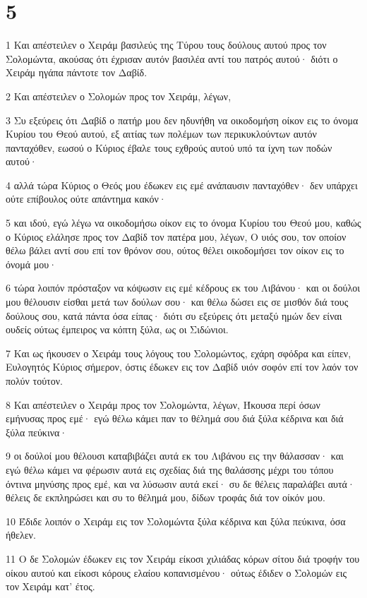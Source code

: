 \chapter{5}

\par 1 Και απέστειλεν ο Χειράμ βασιλεύς της Τύρου τους δούλους αυτού προς τον Σολομώντα, ακούσας ότι έχρισαν αυτόν βασιλέα αντί του πατρός αυτού· διότι ο Χειράμ ηγάπα πάντοτε τον Δαβίδ.
\par 2 Και απέστειλεν ο Σολομών προς τον Χειράμ, λέγων,
\par 3 Συ εξεύρεις ότι Δαβίδ ο πατήρ μου δεν ηδυνήθη να οικοδομήση οίκον εις το όνομα Κυρίου του Θεού αυτού, εξ αιτίας των πολέμων των περικυκλούντων αυτόν πανταχόθεν, εωσού ο Κύριος έβαλε τους εχθρούς αυτού υπό τα ίχνη των ποδών αυτού·
\par 4 αλλά τώρα Κύριος ο Θεός μου έδωκεν εις εμέ ανάπαυσιν πανταχόθεν· δεν υπάρχει ούτε επίβουλος ούτε απάντημα κακόν·
\par 5 και ιδού, εγώ λέγω να οικοδομήσω οίκον εις το όνομα Κυρίου του Θεού μου, καθώς ο Κύριος ελάλησε προς τον Δαβίδ τον πατέρα μου, λέγων, Ο υιός σου, τον οποίον θέλω βάλει αντί σου επί τον θρόνον σου, ούτος θέλει οικοδομήσει τον οίκον εις το όνομά μου·
\par 6 τώρα λοιπόν πρόσταξον να κόψωσιν εις εμέ κέδρους εκ του Λιβάνου· και οι δούλοι μου θέλουσιν είσθαι μετά των δούλων σου· και θέλω δώσει εις σε μισθόν διά τους δούλους σου, κατά πάντα όσα είπας· διότι συ εξεύρεις ότι μεταξύ ημών δεν είναι ουδείς ούτως έμπειρος να κόπτη ξύλα, ως οι Σιδώνιοι.
\par 7 Και ως ήκουσεν ο Χειράμ τους λόγους του Σολομώντος, εχάρη σφόδρα και είπεν, Ευλογητός Κύριος σήμερον, όστις έδωκεν εις τον Δαβίδ υιόν σοφόν επί τον λαόν τον πολύν τούτον.
\par 8 Και απέστειλεν ο Χειράμ προς τον Σολομώντα, λέγων, Ήκουσα περί όσων εμήνυσας προς εμέ· εγώ θέλω κάμει παν το θέλημά σου διά ξύλα κέδρινα και διά ξύλα πεύκινα·
\par 9 οι δούλοί μου θέλουσι καταβιβάζει αυτά εκ του Λιβάνου εις την θάλασσαν· και εγώ θέλω κάμει να φέρωσιν αυτά εις σχεδίας διά της θαλάσσης μέχρι του τόπου όντινα μηνύσης προς εμέ, και να λύσωσιν αυτά εκεί· συ δε θέλεις παραλάβει αυτά· θέλεις δε εκπληρώσει και συ το θέλημά μου, δίδων τροφάς διά τον οίκόν μου.
\par 10 Έδιδε λοιπόν ο Χειράμ εις τον Σολομώντα ξύλα κέδρινα και ξύλα πεύκινα, όσα ήθελεν.
\par 11 Ο δε Σολομών έδωκεν εις τον Χειράμ είκοσι χιλιάδας κόρων σίτου διά τροφήν του οίκου αυτού και είκοσι κόρους ελαίου κοπανισμένου· ούτως έδιδεν ο Σολομών εις τον Χειράμ κατ' έτος.
